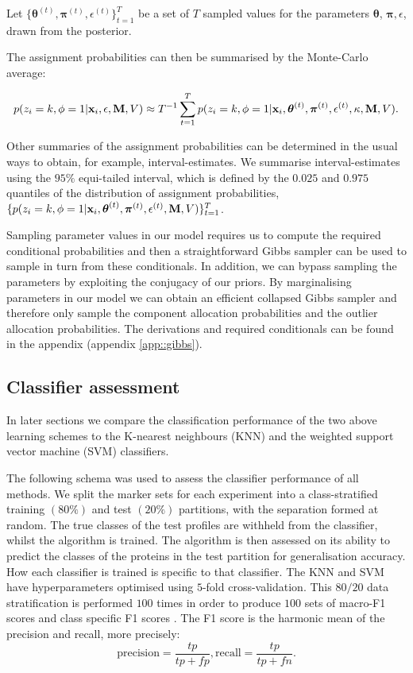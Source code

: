 \documentclass[12pt,english]{article}\usepackage[]{graphicx}\usepackage[]{color}
\begin{document}
Let
$\{\boldsymbol{\theta}^{(t)}, \boldsymbol{\pi}^{(t)},
\epsilon^{(t)}\}_{t=1}^T$ be a set of $T$ sampled values for the
parameters $\boldsymbol{\theta}$, $\boldsymbol{\pi}, \epsilon$, drawn
from the posterior.


The assignment probabilities can then be summarised by the Monte-Carlo
average:

\[p(z_i = k, \phi = 1 | {\bf x}_i, \epsilon, {\bf M}, V) \approx T^{-1}\sum_{t=1}^{T}p(z_i = k, \phi = 1 | {\bf x}_i, \boldsymbol{\theta}^{(t)}, \boldsymbol{\pi}^{(t)} , \epsilon^{(t)}, \kappa, {\bf M}, V).\]

Other summaries of the assignment probabilities can be determined in
the usual ways to obtain, for example, interval-estimates. We
summarise interval-estimates using the $95\%$ equi-tailed interval,
which is defined by the $0.025$ and $0.975$ quantiles of the
distribution of assignment probabilities,
$\{p(z_i = k, \phi = 1 | {\bf x}_i, \boldsymbol{\theta}^{(t)},
\boldsymbol{\pi}^{(t)} , \epsilon^{(t)}, {\bf M}, V) \}_{t=1}^T$.

Sampling parameter values in our model requires us to compute the
required conditional probabilities and then a straightforward Gibbs
sampler can be used to sample in turn from these conditionals. In
addition, we can bypass sampling the parameters by exploiting the
conjugacy of our priors. By marginalising parameters in our model we
can obtain an efficient collapsed Gibbs sampler and therefore only
sample the component allocation probabilities and the outlier
allocation probabilities. The derivations and required conditionals
can be found in the appendix (appendix \ref{app::gibbs}).

\subsection{Classifier assessment}\label{section::assessment}

In later sections we compare the classification performance of the two
above learning schemes to the K-nearest neighbours (KNN) and the
weighted support vector machine (SVM) classifiers.

The following schema was used to assess the classifier performance of
all methods. We split the marker sets for each experiment into a
class-stratified training $(80\%)$ and test $(20\%)$ partitions, with
the separation formed at random. The true classes of the test profiles
are withheld from the classifier, whilst the algorithm is trained. The
algorithm is then assessed on its ability to predict the classes of
the proteins in the test partition for generalisation accuracy. How
each classifier is trained is specific to that classifier.  The KNN
and SVM have hyperparameters optimised using $5$-fold
cross-validation. This $80/20$ data stratification is performed $100$
times in order to produce $100$ sets of macro-F1 \citep{He::2009}
scores and class specific F1 scores \citep{Breckels:2016}. The F1
score is the harmonic mean of the precision and recall, more
precisely:
\[\text{precision}=\frac{tp}{tp+fp}, \text{recall} = \frac{tp}{tp+fn}.\]
\end{document}
